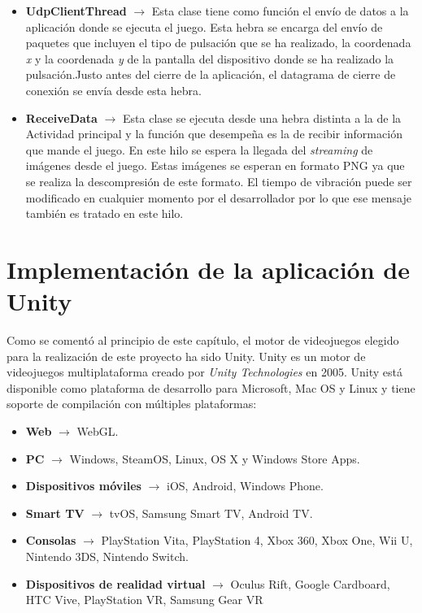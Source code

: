 \begin {itemize}
\item \textbf{UdpClientThread} $\rightarrow$ Esta clase tiene como funci\'on el env\'io de datos a la aplicaci\'on donde se ejecuta el juego. Esta hebra se encarga del env\'io de paquetes que incluyen el tipo de pulsaci\'on que se ha realizado, la coordenada \textit{x} y la coordenada \textit{y} de la pantalla del dispositivo donde se ha realizado la pulsaci\'on.Justo antes del cierre de la aplicaci\'on, el datagrama de cierre de conexi\'on se env\'ia desde esta hebra.

\item \textbf{ReceiveData} $\rightarrow$ Esta clase se ejecuta desde una hebra distinta a la de la Actividad principal y la funci\'on que desempe\~na es la de recibir informaci\'on que mande el juego. En este hilo se espera la llegada del \textit{streaming} de im\'agenes desde el juego. Estas im\'agenes se esperan en formato PNG ya que se realiza la descompresi\'on de este formato. El tiempo de vibraci\'on puede ser modificado en cualquier momento por el desarrollador por lo que ese mensaje tambi\'en es tratado en este hilo.
\end {itemize}




\section{Implementaci\'on de la aplicaci\'on de Unity}
\label{unity}

Como se coment\'o al principio de este cap\'itulo, el motor de videojuegos elegido para la realizaci\'on de este proyecto ha sido Unity. Unity es un motor de videojuegos multiplataforma creado por \textit{Unity Technologies} en 2005. Unity est\'a disponible como plataforma de desarrollo para Microsoft, Mac OS y Linux y tiene soporte de compilaci\'on con m\'ultiples plataformas:\\

\begin {itemize}
\item \textbf{Web} $\rightarrow$ WebGL.
\item \textbf{PC} $\rightarrow$ Windows, SteamOS, Linux, OS X y Windows Store Apps.
\item \textbf{Dispositivos m\'oviles} $\rightarrow$ iOS, Android, Windows Phone.
\item \textbf{Smart TV} $\rightarrow$ tvOS, Samsung Smart TV, Android TV.
\item \textbf{Consolas} $\rightarrow$ PlayStation Vita, PlayStation 4, Xbox 360, Xbox One, Wii U, Nintendo 3DS, Nintendo Switch.
\item \textbf{Dispositivos de realidad virtual} $\rightarrow$ Oculus Rift, Google Cardboard, HTC Vive, PlayStation VR, Samsung Gear VR
\end {itemize}

